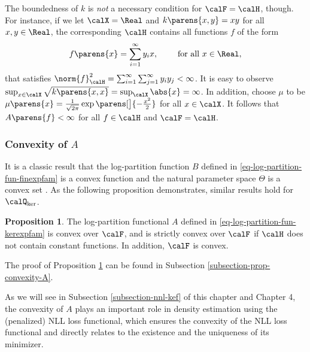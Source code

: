 \documentclass[12pt]{article}
\theoremstyle{definition}
\theoremstyle{theorem}
\newtheorem{proposition}{Proposition}
\theoremstyle{remark}
\begin{document}
The boundedness of $k$ is \emph{not} a necessary condition for $\calF = \calH$, though. For instance, if we let $\calX = \Real$ and $k \parens{x, y} = x y$ for all $x, y \in \Real$, the corresponding $\calH$ contains all functions $f$ of the form 
\begin{align*}
	f \parens{x} = \sum_{i=1}^{\infty} y_i x, \qquad \text{ for all } x \in \Real, 
\end{align*}
that satisfies $\norm{f}_{\calH}^2 = \sum_{i=1}^{\infty} \sum_{j=1}^{\infty} y_i y_j < \infty$. It is easy to observe $\sup_{x \in \calX} \sqrt{k \parens{x, x} } = \sup_{\calX} \abs{x} = \infty$. In addition, choose $\mu$ to be $\mu \parens{x} = \frac{1}{\sqrt{2 \pi}} \exp \parens[\big]{-\frac{x^2}{2}}$ for all $x \in \calX$. It follows that $A \parens{f} < \infty$ for all $f \in \calH$ and $\calF = \calH$. 

\subsubsection{Convexity of $A$}

It is a classic result that the log-partition function $B$ defined in \eqref{eq-log-partition-fun-finexpfam} is a convex function and the natural parameter space $\Theta$ is a convex set \parencites[Theorem 7.1 in][]{Barndorff-Nielsen2014-ua}. As the following proposition demonstrates, similar results hold for $\calQ_{\ker}$. 

\begin{proposition}\label{prop-convexity-A}
	The log-partition functional $A$ defined in \eqref{eq-log-partition-fun-kerexpfam} is convex over $\calF$, and is strictly convex over $\calF$ if $\calH$ does $\mathrm{not}$ contain constant functions. In addition, $\calF$ is convex. 
\end{proposition}

The proof of Proposition \ref{prop-convexity-A} can be found in Subsection \ref{subsection-prop-convexity-A}. 

As we will see in Subsection \ref{subsection-nnl-kef} of this chapter and Chapter 4, the convexity of $A$ plays an important role in density estimation using the (penalized) NLL loss functional, which ensures the convexity of the NLL loss functional and directly relates to the existence and the uniqueness of its minimizer. 
\end{document}

